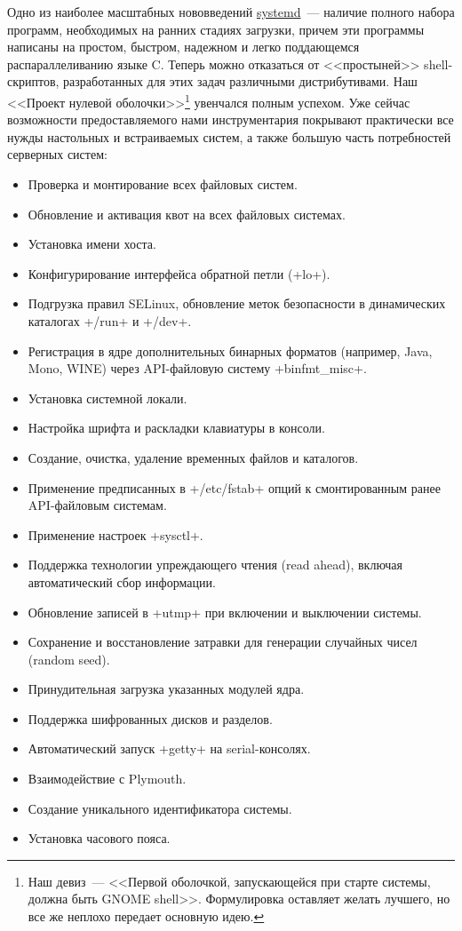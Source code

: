 \documentclass[10pt,oneside,a4paper]{article}
\begin{document}
Одно из наиболее масштабных нововведений
\href{http://www.freedesktop.org/wiki/Software/systemd}{systemd}~--- наличие
полного набора программ, необходимых на ранних стадиях загрузки, причем эти
программы написаны на простом, быстром, надежном и легко поддающемся
распараллеливанию языке C. Теперь можно отказаться от <<простыней>>
shell-скриптов, разработанных для этих задач различными дистрибутивами. Наш
<<Проект нулевой оболочки>>\footnote{Наш девиз~--- <<Первой оболочкой,
запускающейся при старте системы, должна быть GNOME shell>>. Формулировка
оставляет желать лучшего, но все же неплохо передает основную идею.} увенчался
полным успехом. Уже сейчас возможности предоставляемого нами инструментария
покрывают практически все нужды настольных и встраиваемых систем, а также
большую часть потребностей серверных систем:
\begin{itemize}
	\item Проверка и монтирование всех файловых систем.
	\item Обновление и активация квот на всех файловых системах.
	\item Установка имени хоста.
	\item Конфигурирование интерфейса обратной петли (+lo+).
	\item Подгрузка правил SELinux, обновление
		меток безопасности в динамических каталогах +/run+ и +/dev+.
	\item Регистрация в ядре дополнительных бинарных форматов (например,
		Java, Mono, WINE) через API-файловую систему +binfmt_misc+.
	\item Установка системной локали.
	\item Настройка шрифта и раскладки клавиатуры в консоли.
	\item Создание, очистка, удаление временных файлов и каталогов.
	\item Применение предписанных в +/etc/fstab+ опций к смонтированным
		ранее API-файловым системам.
	\item Применение настроек +sysctl+.
	\item Поддержка технологии упреждающего чтения (read ahead), включая
		автоматический сбор информации.
	\item Обновление записей в +utmp+ при включении и выключении системы.
	\item Сохранение и восстановление затравки для генерации случайных чисел
		(random seed).
	\item Принудительная загрузка указанных модулей ядра.
	\item Поддержка шифрованных дисков и разделов.
	\item Автоматический запуск +getty+ на serial-консолях.
	\item Взаимодействие с Plymouth.
	\item Создание уникального идентификатора системы.
	\item Установка часового пояса.
\end{itemize}
\end{document}
